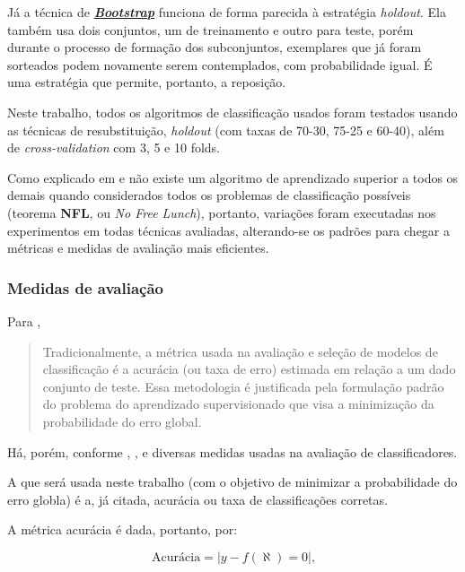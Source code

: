 Já a técnica de \textit{\textbf{\underline{Bootstrap}}} funciona de forma  parecida à estratégia \textit{holdout}. Ela também usa dois conjuntos, um de treinamento e outro para teste, porém durante o processo de formação dos subconjuntos, exemplares que já foram sorteados podem novamente serem contemplados, com probabilidade igual. É uma estratégia que permite, portanto, a reposição.

Neste trabalho, todos os algoritmos de classificação usados foram testados usando as técnicas de resubstituição, \textit{holdout} (com taxas de 70-30, 75-25 e 60-40), além de \textit{cross-validation} com 3, 5 e 10 folds. 

Como explicado em \cite{WolpertMacready} e \cite{Wolpert:1996} não existe um algoritmo de aprendizado superior a todos os demais quando considerados todos os problemas de classificação possíveis (teorema \textbf{NFL}, ou \textit{No Free Lunch}), portanto, variações foram executadas nos experimentos em todas técnicas avaliadas, alterando-se os padrões para chegar a métricas e medidas de avaliação mais eficientes.

\subsubsection{Medidas de avaliação}\label{medidas_avaliacao}

Para \cite{castro_supervised_2011}, \begin{quote}
	Tradicionalmente, a métrica usada na avaliação e seleção de modelos de classificação é a acurácia (ou taxa de erro) estimada em relação a um dado conjunto de teste. Essa metodologia é justificada pela formulação padrão do problema do aprendizado supervisionado que visa a minimização da probabilidade do erro global. 
\end{quote}

Há, porém, conforme \cite{Boscarioli2017}, \cite{aprenda_mineracao_fernando_amaral16}, \cite{classification2013} e \cite{classification_survey2012} diversas medidas usadas na avaliação de classificadores. 

A que será usada neste trabalho (com o objetivo de minimizar a probabilidade do erro globla) é a, já citada, acurácia ou taxa de classificações corretas. 

A métrica acurácia é dada, portanto, por:

\begin{equation}\label{acuracia}
	\textrm{Acurácia} = |y-f(\aleph)=0|\textrm{,}
\end{equation}

